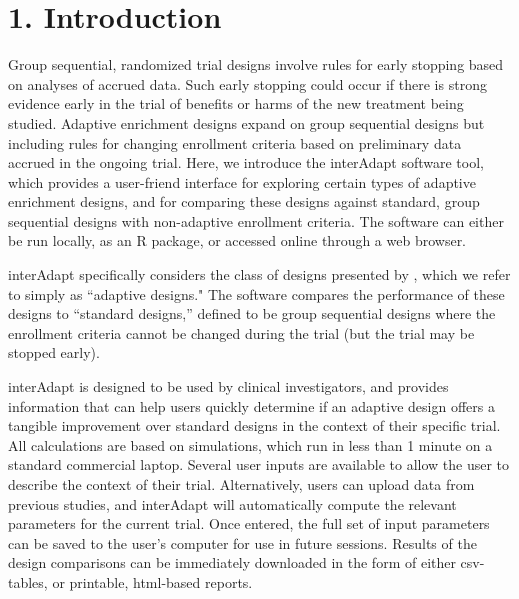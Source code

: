 \documentclass{article}
\newcommand{\interAdapt}{\textsf{interAdapt }}
\begin{document}
\section*{1. Introduction}
Group sequential, randomized trial designs involve rules for early stopping based on analyses of accrued data. Such early stopping could occur if there is strong evidence early in the trial of benefits or harms of the new treatment being studied. Adaptive enrichment designs expand on group sequential designs but including rules for changing enrollment criteria based on preliminary data accrued in the ongoing trial.
Here, we introduce the \interAdapt software tool, which provides a user-friend interface for exploring certain types of adaptive enrichment designs, and for comparing these designs against standard, group sequential designs with non-adaptive enrollment criteria. The software can either be run locally, as an R package, or accessed online through a web browser.

\interAdapt specifically considers the class of designs presented by \cite{Rosenblum2013AdaptMISTIE}, which
we refer to simply as ``adaptive designs." The software compares the performance of these designs to ``standard designs,'' defined to  be group sequential designs where the enrollment criteria cannot be changed during the trial (but the trial may be stopped early). 

\interAdapt is designed to be used by clinical investigators, and provides information that can help users quickly determine if an adaptive design offers a tangible improvement over standard designs in the context of their specific trial. All calculations are based on simulations, which run in less than 1 minute on a standard commercial laptop. Several user inputs are available to allow the user to describe the context of their trial. Alternatively, users can upload data from previous studies, and \interAdapt will automatically compute the relevant parameters for the current trial. Once entered, the full set of input parameters can be saved to the user's computer for use in future sessions. Results of the design comparisons can be immediately downloaded in the form of either csv-tables, or printable, html-based reports.
\end{document}
